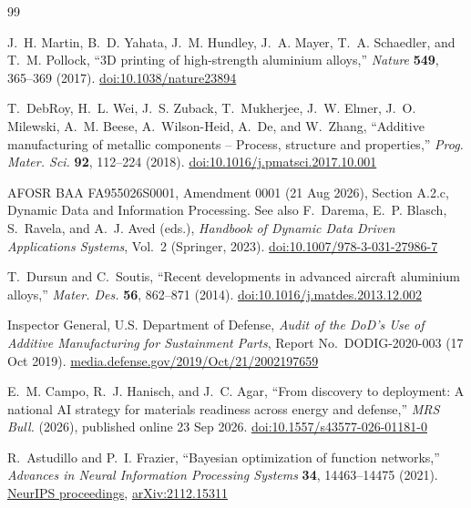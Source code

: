 \documentclass[12pt,letterpaper]{article}
\begin{document}
\clearpage
\setcounter{page}{1}
\renewcommand{\thepage}{R\arabic{page}}  %
\begin{thebibliography}{99}
\setlength{\itemsep}{2pt}

J.~H. Martin, B.~D. Yahata, J.~M. Hundley, J.~A. Mayer, T.~A. Schaedler, and
T.~M. Pollock, ``3D printing of high-strength aluminium alloys,''
\emph{Nature} \textbf{549}, 365--369 (2017).
\href{https://doi.org/10.1038/nature23894}{doi:10.1038/nature23894}

T.~DebRoy, H.~L. Wei, J.~S. Zuback, T.~Mukherjee, J.~W. Elmer,
J.~O. Milewski, A.~M. Beese, A.~Wilson-Heid, A.~De, and W.~Zhang, ``Additive
manufacturing of metallic components -- Process, structure and properties,''
\emph{Prog. Mater. Sci.} \textbf{92}, 112--224 (2018).
\href{https://doi.org/10.1016/j.pmatsci.2017.10.001}{doi:10.1016/j.pmatsci.2017.10.001}

AFOSR BAA FA955026S0001, Amendment 0001 (21 Aug 2026), Section A.2.c,
Dynamic Data and Information Processing. See also F.~Darema, E.~P. Blasch,
S.~Ravela, and A.~J. Aved (eds.), \emph{Handbook of Dynamic Data Driven
Applications Systems}, Vol.~2 (Springer, 2023).
\href{https://doi.org/10.1007/978-3-031-27986-7}{doi:10.1007/978-3-031-27986-7}

T.~Dursun and C.~Soutis, ``Recent developments in advanced aircraft aluminium
alloys,'' \emph{Mater. Des.} \textbf{56}, 862--871 (2014).
\href{https://doi.org/10.1016/j.matdes.2013.12.002}{doi:10.1016/j.matdes.2013.12.002}

Inspector General, U.S. Department of Defense, \emph{Audit of the DoD's Use of
Additive Manufacturing for Sustainment Parts}, Report No.~DODIG-2020-003
(17 Oct 2019).
\href{https://media.defense.gov/2019/Oct/21/2002197659/-1/-1/1/DODIG-2020-003.PDF}{media.defense.gov/2019/Oct/21/2002197659}

E.~M. Campo, R.~J. Hanisch, and J.~C. Agar, ``From discovery to deployment:
A national AI strategy for materials readiness across energy and defense,''
\emph{MRS Bull.} (2026), published online 23 Sep 2026.
\href{https://doi.org/10.1557/s43577-026-01181-0}{doi:10.1557/s43577-026-01181-0}

R.~Astudillo and P.~I. Frazier, ``Bayesian optimization of function networks,''
\emph{Advances in Neural Information Processing Systems} \textbf{34},
14463--14475 (2021).
\href{https://proceedings.neurips.cc/paper_files/paper/2021/hash/792c7b5aae4a79e78aaeda80516ae2ac-Abstract.html}{NeurIPS proceedings},
\href{https://arxiv.org/abs/2112.15311}{arXiv:2112.15311}


\end{thebibliography}
\end{document}
